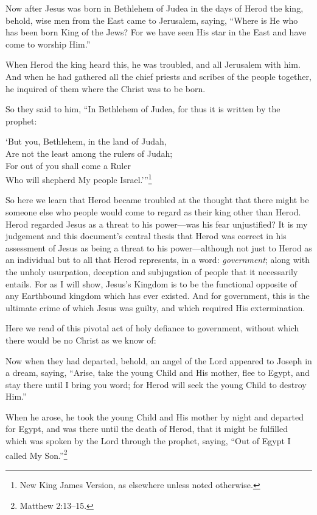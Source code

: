 \documentclass[letterpaper,12pt]{article}
\newenvironment{squotation}
  {\small\quotation}
  {\endquotation\normalsize}
\newenvironment{sverse}
  {\small\verse}
  {\endverse\normalsize}
\begin{document}
\begin{squotation}
Now after Jesus was born in Bethlehem of Judea in the days of Herod the king, behold, wise men from the East came to Jerusalem, saying, ``Where is He who has been born King of the Jews? For we have seen His star in the East and have come to worship Him.''

When Herod the king heard this, he was troubled, and all Jerusalem with him. And when he had gathered all the chief priests and scribes of the people together, he inquired of them where the Christ was to be born.

So they said to him, ``In Bethlehem of Judea, for thus it is written by the prophet:

\begin{sverse}
`But you, Bethlehem, in the land of Judah,\\
Are not the least among the rulers of Judah;\\
For out of you shall come a Ruler\\
Who will shepherd My people Israel.'\thinspace''\footnote{New King James Version, as elsewhere unless noted otherwise.}
\end{sverse}
\end{squotation}

So here we learn that Herod became troubled at the thought that there might be someone else who people would come to regard as their king other than Herod. Herod regarded Jesus as a threat to his power---was his fear unjustified? It is my judgement and this document's central thesis that Herod was correct in his assessment of Jesus as being a threat to his power---although not just to Herod as an individual but to all that Herod represents, in a word: \emph{government}; along with the unholy usurpation, deception and subjugation of people that it necessarily entails. For as I will show, Jesus's Kingdom is to be the functional opposite of any Earthbound kingdom which has ever existed. And for government, this is the ultimate crime of which Jesus was guilty, and which required His extermination.

Here we read of this pivotal act of holy defiance to government, without which there would be no Christ as we know of:

\begin{squotation}
Now when they had departed, behold, an angel of the Lord appeared to Joseph in a dream, saying, ``Arise, take the young Child and His mother, flee to Egypt, and stay there until I bring you word; for Herod will seek the young Child to destroy Him.''

When he arose, he took the young Child and His mother by night and departed for Egypt, and was there until the death of Herod, that it might be fulfilled which was spoken by the Lord through the prophet, saying, ``Out of Egypt I called My Son.''\footnote{Matthew 2:13--15.}
\end{squotation}
\end{document}
